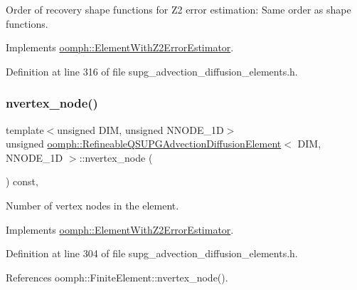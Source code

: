 Order of recovery shape functions for Z2 error estimation\+: Same order as shape functions. 



Implements \hyperlink{classoomph_1_1ElementWithZ2ErrorEstimator_af39480835bd3e0f6b2f4f7a9a4044798}{oomph\+::\+Element\+With\+Z2\+Error\+Estimator}.



Definition at line 316 of file supg\+\_\+advection\+\_\+diffusion\+\_\+elements.\+h.

\mbox{\label{classoomph_1_1RefineableQSUPGAdvectionDiffusionElement_a7cd6f311a712fba0bf53a148cd737d1b}} 
\subsubsection{\texorpdfstring{nvertex\+\_\+node()}{nvertex\_node()}}
{\footnotesize\ttfamily template$<$unsigned D\+IM, unsigned N\+N\+O\+D\+E\+\_\+1D$>$ \\
unsigned \hyperlink{classoomph_1_1RefineableQSUPGAdvectionDiffusionElement}{oomph\+::\+Refineable\+Q\+S\+U\+P\+G\+Advection\+Diffusion\+Element}$<$ D\+IM, N\+N\+O\+D\+E\+\_\+1D $>$\+::nvertex\+\_\+node (\begin{DoxyParamCaption}{ }\end{DoxyParamCaption}) const\hspace{0.3cm}{\ttfamily [inline]}, {\ttfamily [virtual]}}



Number of vertex nodes in the element. 



Implements \hyperlink{classoomph_1_1ElementWithZ2ErrorEstimator_a19495a0e77ef4ff35f15fdf7913b4077}{oomph\+::\+Element\+With\+Z2\+Error\+Estimator}.



Definition at line 304 of file supg\+\_\+advection\+\_\+diffusion\+\_\+elements.\+h.



References oomph\+::\+Finite\+Element\+::nvertex\+\_\+node().

